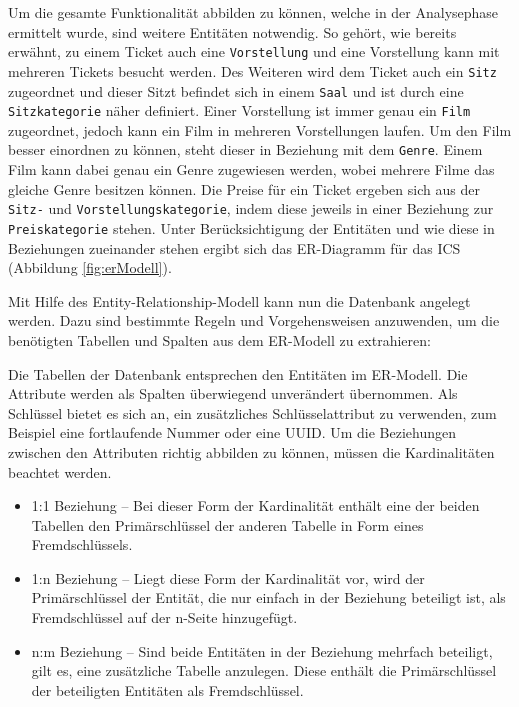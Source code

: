 		Um die gesamte Funktionalität abbilden zu können, welche in der Analysephase ermittelt wurde, sind weitere Entitäten notwendig. So gehört, wie bereits erwähnt, zu einem Ticket auch eine \texttt{Vorstellung} und eine Vorstellung kann mit	 mehreren Tickets besucht werden. Des Weiteren wird dem Ticket auch ein \texttt{Sitz} zugeordnet und dieser Sitzt befindet sich in einem \texttt{Saal} und ist durch eine \texttt{Sitzkategorie} näher definiert. Einer Vorstellung ist immer genau ein \texttt{Film} zugeordnet, jedoch kann ein Film in mehreren Vorstellungen laufen. Um den Film besser einordnen zu können, steht dieser in Beziehung mit dem \texttt{Genre}. Einem Film kann dabei genau ein Genre zugewiesen werden, wobei mehrere Filme das gleiche Genre besitzen können. Die Preise für ein Ticket ergeben sich aus der \texttt{Sitz-} und \texttt{Vorstellungskategorie}, indem diese jeweils in einer Beziehung zur \texttt{Preiskategorie} stehen. 
		Unter Berücksichtigung der Entitäten und wie diese in Beziehungen zueinander stehen ergibt sich das ER-Diagramm für das \ac{ICS} (Abbildung  \ref{fig:erModell}).
		
		Mit Hilfe des Entity-Relationship-Modell kann nun die Datenbank angelegt werden. Dazu sind bestimmte Regeln und Vorgehensweisen anzuwenden, um die benötigten Tabellen und Spalten aus dem ER-Modell zu extrahieren:
				
		Die Tabellen der Datenbank entsprechen den Entitäten im ER-Modell. Die Attribute werden als Spalten überwiegend unverändert übernommen. Als Schlüssel bietet es sich an, ein zusätzliches Schlüsselattribut zu verwenden, zum Beispiel eine fortlaufende Nummer oder eine \ac{UUID}. Um die Beziehungen zwischen den Attributen richtig abbilden zu können, müssen die Kardinalitäten beachtet werden. 
				\begin{itemize}
					\item 1:1 Beziehung -- Bei dieser Form der Kardinalität enthält eine der beiden Tabellen den Primärschlüssel der anderen Tabelle in Form eines Fremdschlüssels.
					\item 1:n Beziehung -- Liegt diese Form der Kardinalität vor, wird der Primärschlüssel der Entität, die nur einfach in der Beziehung beteiligt ist, als Fremdschlüssel auf der n-Seite hinzugefügt. 
					\item n:m Beziehung -- Sind beide Entitäten in der Beziehung mehrfach beteiligt, gilt es, eine zusätzliche Tabelle anzulegen. Diese enthält die Primärschlüssel der beteiligten Entitäten als Fremdschlüssel.
				\end{itemize}
		
